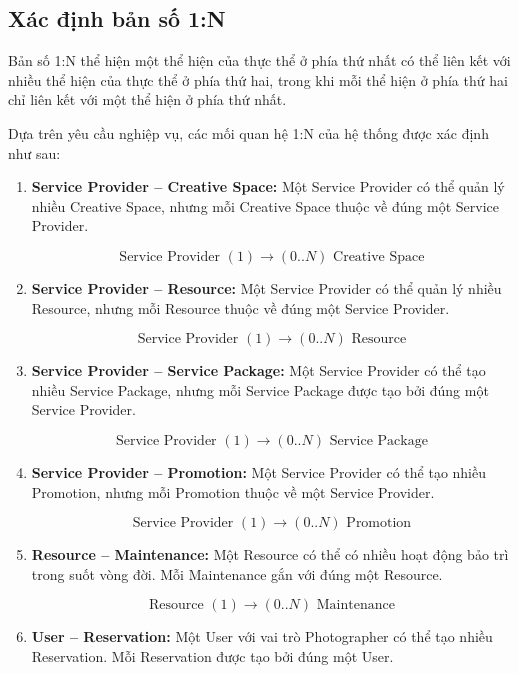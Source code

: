\subsection{Xác định bản số 1:N}

Bản số 1:N thể hiện một thể hiện của thực thể ở phía thứ nhất có thể liên kết với nhiều thể hiện của thực thể ở phía thứ hai, trong khi mỗi thể hiện ở phía thứ hai chỉ liên kết với một thể hiện ở phía thứ nhất.

Dựa trên yêu cầu nghiệp vụ, các mối quan hệ 1:N của hệ thống được xác định như sau:

\begin{enumerate}

\item \textbf{Service Provider -- Creative Space:} Một Service Provider có thể quản lý nhiều Creative Space, nhưng mỗi Creative Space thuộc về đúng một Service Provider.

\[
\text{Service Provider } (1) \longrightarrow (0..N) \text{ Creative Space}
\]

\item \textbf{Service Provider -- Resource:} Một Service Provider có thể quản lý nhiều Resource, nhưng mỗi Resource thuộc về đúng một Service Provider.

\[
\text{Service Provider } (1) \longrightarrow (0..N) \text{ Resource}
\]

\item \textbf{Service Provider -- Service Package:} Một Service Provider có thể tạo nhiều Service Package, nhưng mỗi Service Package được tạo bởi đúng một Service Provider.

\[
\text{Service Provider } (1) \longrightarrow (0..N) \text{ Service Package}
\]

\item \textbf{Service Provider -- Promotion:} Một Service Provider có thể tạo nhiều Promotion, nhưng mỗi Promotion thuộc về một Service Provider.

\[
\text{Service Provider } (1) \longrightarrow (0..N) \text{ Promotion}
\]

\item \textbf{Resource -- Maintenance:} Một Resource có thể có nhiều hoạt động bảo trì trong suốt vòng đời. Mỗi Maintenance gắn với đúng một Resource.

\[
\text{Resource } (1) \longrightarrow (0..N) \text{ Maintenance}
\]

\item \textbf{User -- Reservation:} Một User với vai trò Photographer có thể tạo nhiều Reservation. Mỗi Reservation được tạo bởi đúng một User.


\end{enumerate}
